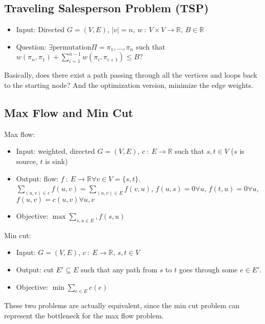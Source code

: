 \documentclass[10pt]{article}
\begin{document}
\subsection*{Traveling Salesperson Problem (TSP)}
\begin{itemize}
    \item Input: Directed $G = (V, E)$, $|v| = n$, $w \::\: V \times V \rightarrow \mathbb{R}$, $B \in \mathbb{R}$
    \item Question: $\exists \text{permutation} \Pi = \pi_1, \dots, \pi_n$ such that $w(\pi_n, \pi_1) + \sum_{i = 1}^{n - 1} w(\pi_i, \pi_{i + 1}) \leq B$?
\end{itemize}
Basically, does there exist a path passing through all the vertices and loops back to the starting node?  And the optimization version, minimize the edge weights.

\subsection*{Max Flow and Min Cut}
Max flow:
\begin{itemize}
    \item Input: weighted, directed $G = (V, E)$, $c \::\: E \rightarrow \mathbb{R}$ such that $s, t \in V$ ($s$ is source, $t$ is sink)
    \item Output: flow: $f \::\: E \rightarrow \mathbb{R} \forall v \in V = \{s, t\}$.  $\sum_{(u, v) \in e} f(u, v) = \sum_{(u, v) \in E} f(v, u)$, $f(u, s) = 0 \forall u$, $f(t, u) = 0 \forall u$, $f(u, v) = c(u, v) \forall u, v$
    \item Objective: $\max \sum_{s, u \in E}, f(s, u)$
\end{itemize}
Min cut:
\begin{itemize}
    \item Input: $G = (V, E)$, $c \::\: E \rightarrow \mathbb{R}$, $s, t \in V$
    \item Output: cut $E' \subseteq E$ such that any path from $s$ to $t$ goes through some $e \in E'$.
    \item Objective: $\min \sum_{e \in E} c(e)$
\end{itemize}
These two problems are actually equivalent, since the min cut problem can represent the bottleneck for the max flow problem.
\end{document}
